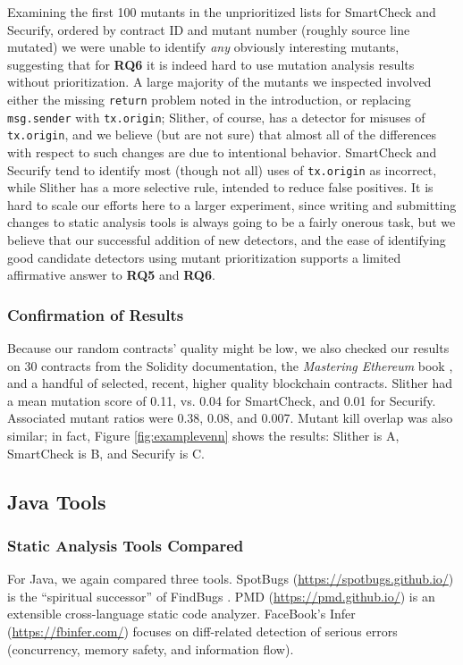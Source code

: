 Examining the first 100 mutants in the unprioritized lists for SmartCheck and Securify, ordered by contract ID and mutant number (roughly source line mutated) we were unable to identify \emph{any} obviously interesting mutants, suggesting that for {\bf RQ6} it is indeed hard to use mutation analysis results without prioritization. A large majority of the mutants we inspected involved either the missing
{\tt return} problem noted in the introduction, or replacing {\tt msg.sender} with {\tt tx.origin}; Slither, of course, has a detector for misuses of {\tt tx.origin}, and we believe (but are not sure) that almost all of the differences with respect to such changes are due to intentional behavior. SmartCheck and Securify tend to identify most (though not all) uses of {\tt tx.origin} as incorrect, while Slither has a more selective rule, intended to reduce false positives.
It is hard to scale our efforts here to a larger experiment, since writing and submitting changes to static analysis tools is always going to be a fairly onerous task, but we believe that our successful addition of new detectors, and the ease of identifying good candidate detectors using mutant prioritization supports a limited affirmative answer to {\bf RQ5} and {\bf RQ6}.

\subsubsection{Confirmation of Results}  Because our random contracts' quality might be low, we also checked our results on 30 contracts from the Solidity documentation, the \emph{Mastering Ethereum} book \cite{masteringEth}, and a handful of selected, recent, higher quality blockchain contracts.  Slither had a mean mutation score of 0.11, vs. 0.04 for SmartCheck, and 0.01 for Securify.  Associated mutant ratios were 0.38, 0.08, and 0.007.  Mutant kill overlap was also similar; in fact, Figure \ref{fig:examplevenn} shows the results: Slither is A, SmartCheck is B, and Securify is C.

\subsection{Java Tools}

\subsubsection{Static Analysis Tools Compared}

For Java, we again compared three tools.  SpotBugs (\url{https://spotbugs.github.io/}) is the ``spiritual successor'' of FindBugs \cite{FindBugs,CompareJavaTools}.  PMD (\url{https://pmd.github.io/}) \cite{CompareJavaTools} is an extensible cross-language static code analyzer.  FaceBook's Infer (\url{https://fbinfer.com/}) \cite{Infer} focuses on diff-related detection of serious errors (concurrency, memory safety, and information flow).

